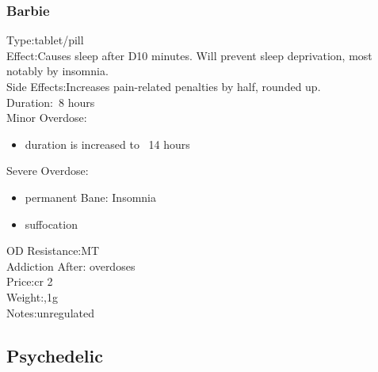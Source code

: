 \subsubsection{Barbie}
Type:\tab tablet/pill\\
Effect:\tab Causes sleep after D10 minutes. Will prevent sleep deprivation, most notably by insomnia.\\
Side Effects:\tab Increases pain-related penalties by half, rounded up.\\
Duration:\tab ~8 hours\\
Minor Overdose:\\
\begin{itemize}
	\setlength\itemsep{-8mm}
	\vspace{-12mm}
	\item duration is increased to ~14 hours
\end{itemize}
Severe Overdose:\\
\begin{itemize}
	\setlength\itemsep{-8mm}
	\vspace{-12mm}
	\item permanent Bane: Insomnia
	\item suffocation
\end{itemize}
OD Resistance:\tab MT\\
Addiction After: overdoses\\
Price:\tab cr 2\\
Weight:,1g\\
Notes:\tab unregulated


\subsection{Psychedelic}

